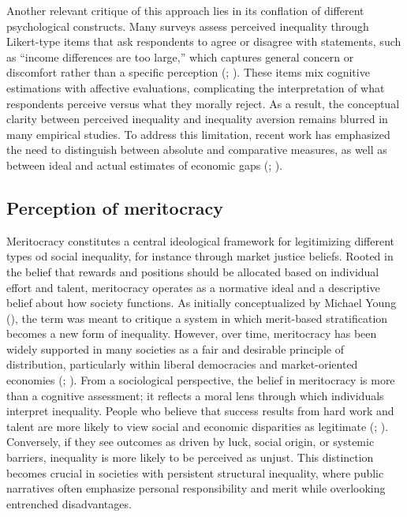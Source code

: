 \documentclass[
  12pt,
]{article}
\begin{document}
Another relevant critique of this approach lies in its conflation of
different psychological constructs. Many surveys assess perceived
inequality through Likert-type items that ask respondents to agree or
disagree with statements, such as ``income differences are too large,''
which captures general concern or discomfort rather than a specific
perception (;
). These items mix cognitive estimations with affective
evaluations, complicating the interpretation of what respondents
perceive versus what they morally reject. As a result, the conceptual
clarity between perceived inequality and inequality aversion remains
blurred in many empirical studies. To address this limitation, recent
work has emphasized the need to distinguish between absolute and
comparative measures, as well as between ideal and actual estimates of
economic gaps (;
).

\subsection{Perception of meritocracy}\label{perception-of-meritocracy}

Meritocracy constitutes a central ideological framework for legitimizing
different types od social inequality, for instance through market
justice beliefs. Rooted in the belief that rewards and positions should
be allocated based on individual effort and talent, meritocracy operates
as a normative ideal and a descriptive belief about how society
functions. As initially conceptualized by Michael Young
(), the term was meant to critique a
system in which merit-based stratification becomes a new form of
inequality. However, over time, meritocracy has been widely supported in
many societies as a fair and desirable principle of distribution,
particularly within liberal democracies and market-oriented economies
(;
). From a sociological
perspective, the belief in meritocracy is more than a cognitive
assessment; it reflects a moral lens through which individuals interpret
inequality. People who believe that success results from hard work and
talent are more likely to view social and economic disparities as
legitimate (;
).
Conversely, if they see outcomes as driven by luck, social origin, or
systemic barriers, inequality is more likely to be perceived as unjust.
This distinction becomes crucial in societies with persistent structural
inequality, where public narratives often emphasize personal
responsibility and merit while overlooking entrenched disadvantages.
\end{document}
